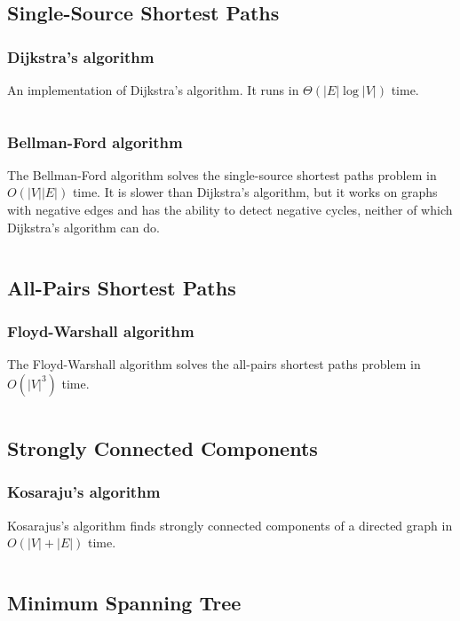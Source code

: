 \documentclass[8pt,a4paper]{amsart}
\newcommand{\code}[1]{\inputminted[linenos]{cpp}{_code/#1}}
\begin{document}
    \subsection{Single-Source Shortest Paths}
        \subsubsection{Dijkstra's algorithm}
            An implementation of Dijkstra's algorithm. It runs in
            $\Theta(|E|\log{|V|})$ time.
            \code{graph/dijkstra.cpp}

        \subsubsection{Bellman-Ford algorithm}
            The Bellman-Ford algorithm solves the single-source shortest paths
            problem in $O(|V||E|)$ time. It is slower than Dijkstra's
            algorithm, but it works on graphs with negative edges and has the
            ability to detect negative cycles, neither of which Dijkstra's
            algorithm can do.
            \code{graph/bellman_ford.cpp}

    \subsection{All-Pairs Shortest Paths}
        \subsubsection{Floyd-Warshall algorithm}
            The Floyd-Warshall algorithm solves the all-pairs shortest paths
            problem in $O(|V|^3)$ time.
            \code{graph/floyd_warshall.cpp}

    \subsection{Strongly Connected Components}
        \subsubsection{Kosaraju's algorithm}
            Kosarajus's algorithm finds strongly connected components of a
            directed graph in $O(|V|+|E|)$ time.
            \code{graph/scc.cpp}

    \subsection{Minimum Spanning Tree}
\end{document}
